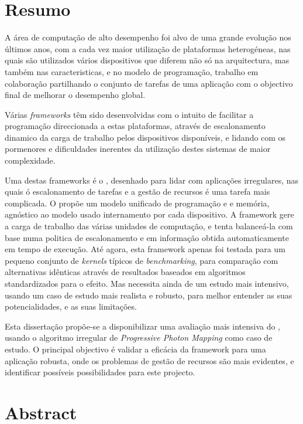\documentclass[main.tex]{subfiles}
\begin{document}
\section*{Resumo}

A área de computação de alto desempenho foi alvo de uma grande evolução nos últimos anos, com a cada vez maior utilização de plataformas heterogéneas, nas quais são utilizados vários dispositivos que diferem não só na arquitectura, mas também nas caracteristicas, e no modelo de programação, trabalho em colaboração partilhando o conjunto de tarefas de uma aplicação com o objectivo final de melhorar o desempenho global.

Várias \textit{frameworks} têm sido desenvolvidas com o intuito de facilitar a programação direccionada a estas plataformas, através de escalonamento dinamico da carga de trabalho pelos dispositivos disponíveis, e lidando com os pormenores e dificuldades inerentes da utilização destes sistemas de maior complexidade.

Uma destas frameworks é o \gama, desenhado para lidar com aplicações irregulares, nas quais ó escalonamento de tarefas e a gestão de recursos é uma tarefa mais complicada. O \gama propõe um modelo unificado de programação e e memória, agnóstico ao modelo usado internamento por cada dispositivo. A framework gere a carga de trabalho das várias unidades de computação, e tenta balanceá-la com base numa politica de escalonamento e em informação obtida automaticamente em tempo de execução. Até agora, esta framework apenas foi testada para um pequeno conjunto de \textit{kernels} típicos de \textit{benchmarking}, para comparação com alternativas idênticas através de resultados baseados em algoritmos standardizados para o efeito. Mas necessita ainda de um estudo mais intensivo, usando um caso de estudo mais realista e robusto, para melhor entender as suas potencialidades, e as suas limitações.

Esta dissertação propõe-se a disponibilizar uma avaliação mais intensiva do \gama, usando o algoritmo irregular de \textit{Progressive Photon Mapping} como caso de estudo. O principal objectivo é validar a eficácia da framework para uma aplicação robusta, onde os problemas de gestão de recursos são mais evidentes, e identificar possíveis possibilidades para este projecto.

\newpage {}
\section*{Abstract}
\end{document}
